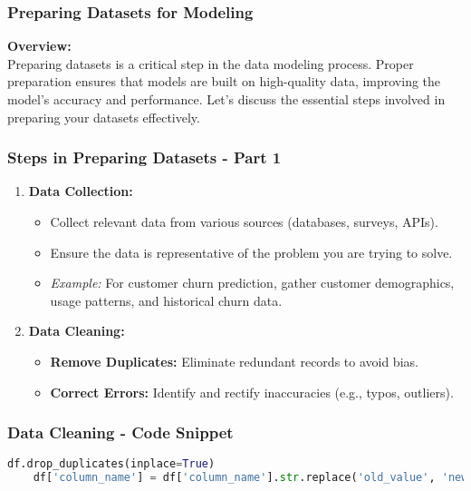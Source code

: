 \documentclass[aspectratio=169]{beamer}
\begin{document}
\begin{frame}
    \frametitle{Preparing Datasets for Modeling}
    \textbf{Overview:} \\
    Preparing datasets is a critical step in the data modeling process. Proper preparation ensures that models are built on high-quality data, improving the model's accuracy and performance. Let's discuss the essential steps involved in preparing your datasets effectively.
\end{frame}

\begin{frame}
    \frametitle{Steps in Preparing Datasets - Part 1}
    \begin{enumerate}
        \item \textbf{Data Collection:}
        \begin{itemize}
            \item Collect relevant data from various sources (databases, surveys, APIs).
            \item Ensure the data is representative of the problem you are trying to solve.
            \item \textit{Example:} For customer churn prediction, gather customer demographics, usage patterns, and historical churn data.
        \end{itemize}
        
        \item \textbf{Data Cleaning:}
        \begin{itemize}
            \item \textbf{Remove Duplicates:} Eliminate redundant records to avoid bias.
            \item \textbf{Correct Errors:} Identify and rectify inaccuracies (e.g., typos, outliers).
        \end{itemize}
    \end{enumerate}
\end{frame}

\begin{frame}[fragile]
    \frametitle{Data Cleaning - Code Snippet}
    \begin{lstlisting}[language=Python]
    df.drop_duplicates(inplace=True)
    df['column_name'] = df['column_name'].str.replace('old_value', 'new_value')
    \end{lstlisting}
\end{frame}
\end{document}
